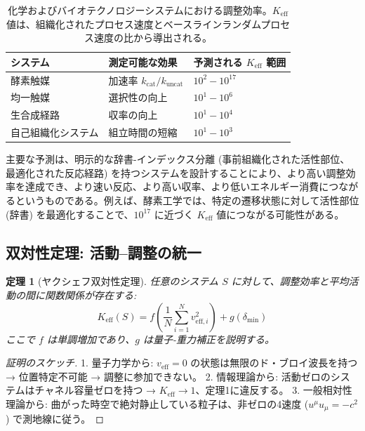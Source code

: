 \documentclass[11pt,a4paper]{article}
\newtheorem{theorem}{定理}
\begin{document}
	\begin{table}[htbp]
		\centering
		\small

			\begin{tabular}{p{}p{0.35\textwidth}p{}}
				\toprule
				\textbf{システム} & \textbf{測定可能な効果} & \textbf{予測される $K_{\mathrm{eff}}$ 範囲} \\
				\midrule
				酵素触媒 & 加速率 $k_{\text{cat}}/k_{\text{uncat}}$ & $10^2 - 10^{17}$ \\
				均一触媒 & 選択性の向上 & $10^1 - 10^6$ \\
				生合成経路 & 収率の向上 & $10^1 - 10^4$ \\
				自己組織化システム & 組立時間の短縮 & $10^1 - 10^3$ \\
				\bottomrule
			\end{tabular}
	
		\caption{化学およびバイオテクノロジーシステムにおける調整効率。$K_{\mathrm{eff}}$ 値は、組織化されたプロセス速度とベースラインランダムプロセス速度の比から導出される。}
		\label{tab:chemical-keff}
	\end{table}
	
	主要な予測は、明示的な辞書-インデックス分離 (事前組織化された活性部位、最適化された反応経路) を持つシステムを設計することにより、より高い調整効率を達成でき、より速い反応、より高い収率、より低いエネルギー消費につながるというものである。例えば、酵素工学では、特定の遷移状態に対して活性部位 (辞書) を最適化することで、$10^{17}$ に近づく $K_{\mathrm{eff}}$ 値につながる可能性がある。
	
	\subsection{双対性定理: 活動–調整の統一}
	
	\begin{theorem}[ヤクシェフ双対性定理]
		任意のシステム $S$ に対して、調整効率と平均活動の間に関数関係が存在する:
		\[
		K_{\mathrm{eff}}(S) = f\left( \frac{1}{N}\sum_{i=1}^N v_{\mathrm{eff},i}^2 \right) + g(\delta_{\min})
		\]
		ここで $f$ は単調増加であり、$g$ は量子-重力補正を説明する。
	\end{theorem}
	
	\begin{proof}[証明のスケッチ]
		1. 量子力学から: $v_{\mathrm{eff}} = 0$ の状態は無限のド・ブロイ波長を持つ → 位置特定不可能 → 調整に参加できない。
		2. 情報理論から: 活動ゼロのシステムはチャネル容量ゼロを持つ → $K_{\mathrm{eff}} \to 1$、定理1に違反する。
		3. 一般相対性理論から: 曲がった時空で絶対静止している粒子は、非ゼロの4速度 ($u^\mu u_\mu = -c^2$) で測地線に従う。
	\end{proof}
	
\end{document}
